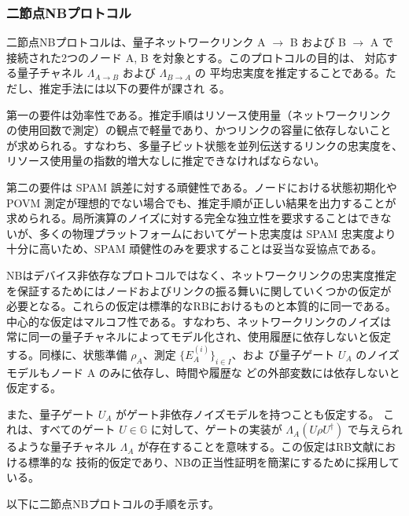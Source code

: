 \documentclass[conference]{IEEEtran}
\begin{document}
\subsubsection*{二節点NBプロトコル}
\label{sec:org775b221}

二節点NBプロトコルは、量子ネットワークリンク A \(\to\) B および B \(\to\)
A で接続された2つのノード A, B を対象とする。このプロトコルの目的は、
対応する量子チャネル \(\Lambda_{A \to B}\) および \(\Lambda_{B \to A}\) の
平均忠実度を推定することである。ただし、推定手法には以下の要件が課され
る。

第一の要件は効率性である。推定手順はリソース使用量（ネットワークリンク
の使用回数で測定）の観点で軽量であり、かつリンクの容量に依存しないこと
が求められる。すなわち、多量子ビット状態を並列伝送するリンクの忠実度を、
リソース使用量の指数的増大なしに推定できなければならない。

第二の要件は SPAM 誤差に対する頑健性である。ノードにおける状態初期化や
POVM 測定が理想的でない場合でも、推定手順が正しい結果を出力することが
求められる。局所演算のノイズに対する完全な独立性を要求することはできな
いが、多くの物理プラットフォームにおいてゲート忠実度は SPAM 忠実度より
十分に高いため、SPAM 頑健性のみを要求することは妥当な妥協点である。

NBはデバイス非依存なプロトコルではなく、ネットワークリンクの忠実度推定
を保証するためにはノードおよびリンクの振る舞いに関していくつかの仮定が
必要となる。これらの仮定は標準的なRBにおけるものと本質的に同一である。
中心的な仮定はマルコフ性である。すなわち、ネットワークリンクのノイズは
常に同一の量子チャネルによってモデル化され、使用履歴に依存しないと仮定
する。同様に、状態準備 \(\rho_A\)、測定 \(\{E_A^{(i)}\}_{i \in I}\)、およ
び量子ゲート \(U_A\) のノイズモデルもノード A のみに依存し、時間や履歴な
どの外部変数には依存しないと仮定する。

また、量子ゲート \(U_A\) がゲート非依存ノイズモデルを持つことも仮定する。
これは、すべてのゲート \(U \in \mathbb{G}\) に対して、ゲートの実装が
\(\Lambda_A(U\rho U^\dagger)\) で与えられるような量子チャネル
\(\Lambda_A\) が存在することを意味する。この仮定はRB文献における標準的な
技術的仮定であり、NBの正当性証明を簡潔にするために採用している。

以下に二節点NBプロトコルの手順を示す。
\end{document}
